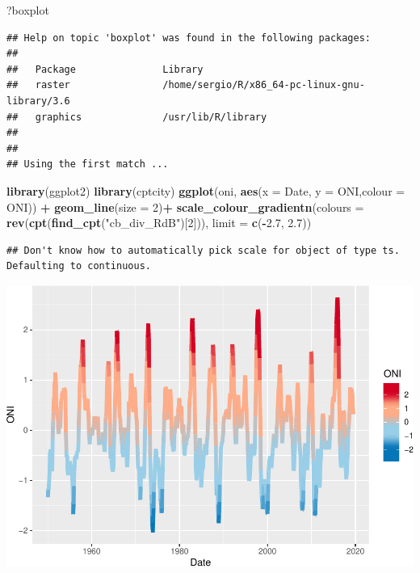 \documentclass[]{book}
\newenvironment{Shaded}{\begin{snugshade}}{\end{snugshade}}
\newcommand{\DataTypeTok}[1]{\textcolor[rgb]{0.13,0.29,0.53}{#1}}
\newcommand{\DecValTok}[1]{\textcolor[rgb]{0.00,0.00,0.81}{#1}}
\newcommand{\FloatTok}[1]{\textcolor[rgb]{0.00,0.00,0.81}{#1}}
\newcommand{\KeywordTok}[1]{\textcolor[rgb]{0.13,0.29,0.53}{\textbf{#1}}}
\newcommand{\NormalTok}[1]{#1}
\newcommand{\OperatorTok}[1]{\textcolor[rgb]{0.81,0.36,0.00}{\textbf{#1}}}
\newcommand{\StringTok}[1]{\textcolor[rgb]{0.31,0.60,0.02}{#1}}
\begin{document}
\begin{Shaded}
\begin{Highlighting}[]
\NormalTok{?boxplot}
\end{Highlighting}
\end{Shaded}

\begin{verbatim}
## Help on topic 'boxplot' was found in the following packages:
## 
##   Package               Library
##   raster                /home/sergio/R/x86_64-pc-linux-gnu-library/3.6
##   graphics              /usr/lib/R/library
## 
## 
## Using the first match ...
\end{verbatim}

\begin{Shaded}
\begin{Highlighting}[]
\KeywordTok{library}\NormalTok{(ggplot2)}
\KeywordTok{library}\NormalTok{(cptcity)}
\KeywordTok{ggplot}\NormalTok{(oni, }
       \KeywordTok{aes}\NormalTok{(}\DataTypeTok{x =}\NormalTok{ Date, }\DataTypeTok{y =}\NormalTok{ ONI,}\DataTypeTok{colour =}\NormalTok{ ONI)) }\OperatorTok{+}\StringTok{ }
\StringTok{  }\KeywordTok{geom_line}\NormalTok{(}\DataTypeTok{size =} \DecValTok{2}\NormalTok{)}\OperatorTok{+}
\KeywordTok{scale_colour_gradientn}\NormalTok{(}\DataTypeTok{colours =} \KeywordTok{rev}\NormalTok{(}\KeywordTok{cpt}\NormalTok{(}\KeywordTok{find_cpt}\NormalTok{(}\StringTok{"cb_div_RdB"}\NormalTok{)[}\DecValTok{2}\NormalTok{])), }
                       \DataTypeTok{limit =} \KeywordTok{c}\NormalTok{(}\OperatorTok{-}\FloatTok{2.7}\NormalTok{, }\FloatTok{2.7}\NormalTok{))}
\end{Highlighting}
\end{Shaded}

\begin{verbatim}
## Don't know how to automatically pick scale for object of type ts. Defaulting to continuous.
\end{verbatim}

\includegraphics{bookdown-demo_files/figure-latex/unnamed-chunk-41-1.pdf}
\end{document}
